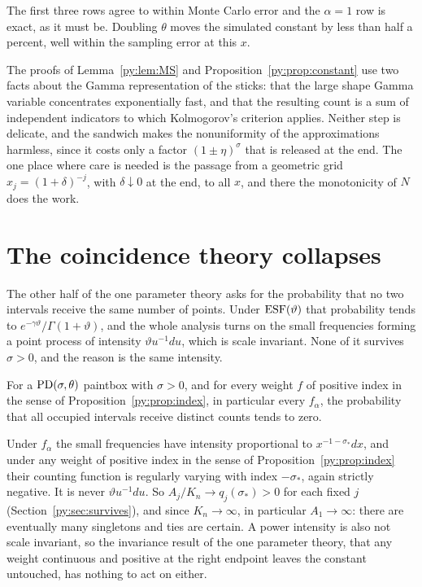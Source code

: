 The first three rows agree to within Monte Carlo error and the $\alpha = 1$ row is exact, as it
must be. Doubling $\theta$ moves the simulated constant by less than half a percent, well within
the sampling error at this $x$.

\begin{remark}
The proofs of Lemma~\ref{py:lem:MS} and Proposition~\ref{py:prop:constant} use two facts about the
Gamma representation of the sticks: that the large shape Gamma variable concentrates exponentially
fast, and that the resulting count is a sum of independent indicators to which Kolmogorov's
criterion applies. Neither step is delicate, and the sandwich makes the nonuniformity of the
approximations harmless, since it costs only a factor $(1\pm\eta)^{\sigma}$ that is released at the
end. The one place where care is needed is the passage from a geometric grid $x_j = (1+\delta)^{-j}$, with $\delta \downarrow 0$ at the end, to all $x$, and there the
monotonicity of $N$ does the work.
\end{remark}

\section{The coincidence theory collapses}
\label{py:sec:coincidence}

The other half of the one parameter theory asks for the probability that no two intervals receive
the same number of points. Under $\mathrm{ESF}(\vartheta)$ that probability tends to
$e^{-\gamma\vartheta}/\Gamma(1+\vartheta)$, and the whole analysis turns on the small frequencies
forming a point process of intensity $\vartheta u^{-1}du$, which is scale invariant. None of it
survives $\sigma > 0$, and the reason is the same intensity.

\begin{proposition}
\label{py:prop:nocoin}
For a $\mathrm{PD}(\sigma,\theta)$ paintbox with $\sigma > 0$, and for every weight $f$ of positive index in
the sense of Proposition~\ref{py:prop:index}, in particular every $f_\alpha$, the probability that all
occupied intervals receive distinct counts tends to zero.
\end{proposition}

Under $f_\alpha$ the small frequencies have intensity proportional to $x^{-1-\sigma_*}dx$, and
under any weight of positive index in the sense of Proposition~\ref{py:prop:index} their counting function is regularly varying with index $-\sigma_*$, again strictly negative. It is
never $\vartheta u^{-1}du$. So $A_j/K_n \to q_j(\sigma_*) > 0$ for each fixed $j$
(Section~\ref{py:sec:survives}), and since $K_n \to \infty$, in particular $A_1 \to \infty$: there are eventually many singletons and ties are certain. A
power intensity is also not scale invariant, so the invariance result of the one parameter theory,
that any weight continuous and positive at the right endpoint leaves the constant untouched, has
nothing to act on either.


